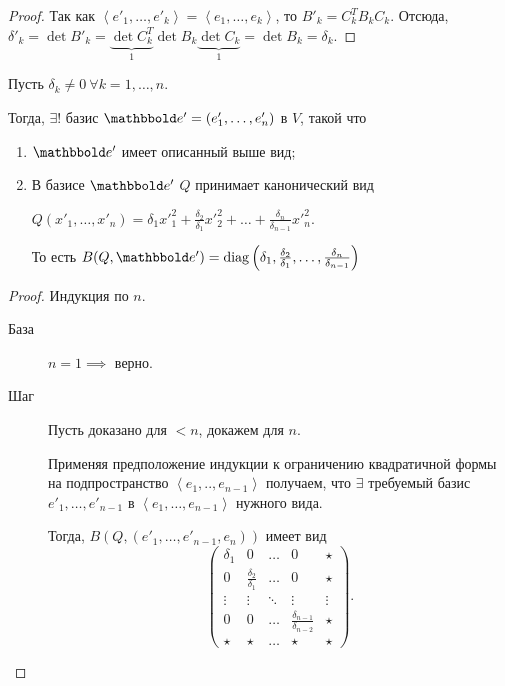 \documentclass[a4paper]{article}
\begin{document}
\begin{colloq}
\begin{proof}
                Так как $\left< e'_1, \dots, e'_k \right> = \left< e_1, \dots, e_k \right>$, то $B'_k = C_k^T B_k C_k$.
                Отсюда, $\delta'_k = \det B'_k = \underbrace{\det C_k^T}_1 \det B_k \underbrace{\det C_k}_1 = \det B_k = \delta_k$.
            \end{proof}

            \begin{theorem}
                Пусть $\delta_k \neq 0 \ \forall k = 1, \dots, n$.

                Тогда, $\exists!$ базис $\E' = (e'_1, \dots, e'_n)$ в $V$, такой что
                \begin{enumerate}
                \item $\E'$ имеет описанный выше вид;
                \item В базисе $\E'$ $Q$ принимает канонический вид

                    $Q(x'_1, \dots, x'_n) = \delta_1 x'^2_1 + \frac{\delta_2}{\delta_1} x'^2_2 + \dots + \frac{\delta_n}{\delta_{n - 1}} x'^2_n$.

                    То есть $B(Q, \E') = \diag\left(\delta_1, \frac{\delta_2}{\delta_1}, \dots, \frac{\delta_n}{\delta_{n - 1}}\right)$
                \end{enumerate}
            \end{theorem}

            \begin{proof}
                Индукция по $n$.

                \begin{description}
                \item[База] $n = 1 \implies $ верно.
                \item[Шаг] Пусть доказано для $< n$, докажем для $n$.

                    Применяя предположение индукции к ограничению квадратичной формы на подпространство $\left< e_1, .., e_{n - 1} \right>$ получаем, что $\exists$ требуемый базис $e'_1, \dots, e'_{n - 1}$ в $\left< e_1, \dots, e_{n - 1} \right>$ нужного вида.

                    Тогда, $B(Q, (e'_1, \dots, e'_{n - 1}, e_n))$ имеет вид 
                    \begin{equation*}
                        \left(\begin{array}{cccc|c}
                            \delta_1 & 0 & \dots & 0 & \star \\
                            0 & \frac{\delta_2}{\delta_1} & \dots & 0 & \star \\
                            \vdots & \vdots & \ddots & \vdots & \vdots \\
                            0 & 0 & \dots & \frac{\delta_{n - 1}}{\delta_{n - 2}} & \star \\
                            \hline
                            \star & \star & \dots & \star & \star
                        \end{array}\right)
                    .\end{equation*}


\end{description}
\end{proof}
\end{colloq}
\end{document}
